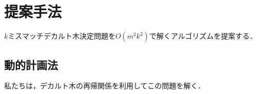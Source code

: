 \chapter{提案手法}
$k$ミスマッチデカルト木決定問題を$O(m^2k^2)$で解くアルゴリズムを提案する．
\section{動的計画法}
私たちは，デカルト木の再帰関係を利用してこの問題を解く．